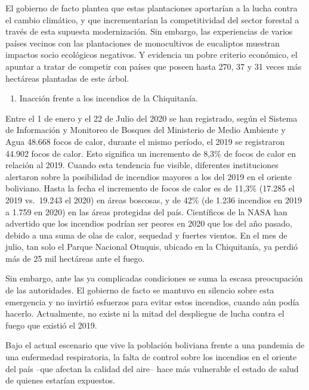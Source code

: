 \documentclass[a4paper, nobind]{templates/ociamthesis}
\providecommand{\tightlist}{%
  \setlength{\itemsep}{0pt}\setlength{\parskip}{0pt}}
\begin{document}
El gobierno de facto plantea que estas plantaciones aportarían a la lucha contra el cambio climático, y que incrementarían la competitividad del sector forestal a través de esta supuesta modernización. Sin embargo, las experiencias de varios países vecinos con las plantaciones de monocultivos de eucaliptos muestran impactos socio ecológicos negativos. Y evidencia un pobre criterio económico, el apuntar a tratar de competir con países que poseen hasta 270, 37 y 31 veces más hectáreas plantadas de este árbol.

\begin{enumerate}
\def\labelenumi{\arabic{enumi}.}
\setcounter{enumi}{2}
\tightlist
\item
  Inacción frente a los incendios de la Chiquitanía.
\end{enumerate}

Entre el 1 de enero y el 22 de Julio del 2020 se han registrado, según el Sistema de Información y Monitoreo de Bosques del Ministerio de Medio Ambiente y Agua 48.668 focos de calor, durante el mismo período, el 2019 se registraron 44.902 focos de calor. Esto significa un incremento de 8,3\% de focos de calor en relación al 2019.
Cuando esta tendencia fue visible, diferentes instituciones alertaron sobre la posibilidad de incendios mayores a los del 2019 en el oriente boliviano. Hasta la fecha el incremento de focos de calor es de 11,3\% (17.285 el 2019 vs.~19.243 el 2020) en áreas boscosas, y de 42\% (de 1.236 incendios en 2019 a 1.759 en 2020) en las áreas protegidas del país. Científicos de la NASA han advertido que los incendios podrían ser peores en 2020 que los del año pasado, debido a una suma de olas de calor, sequedad y fuertes vientos. En el mes de julio, tan solo el Parque Nacional Otuquis, ubicado en la Chiquitanía, ya perdió más de 25 mil hectáreas ante el fuego.

Sin embargo, ante las ya complicadas condiciones se suma la escasa preocupación de las autoridades. El gobierno de facto se mantuvo en silencio sobre esta emergencia y no invirtió esfuerzos para evitar estos incendios, cuando aún podía hacerlo. Actualmente, no existe ni la mitad del despliegue de lucha contra el fuego que existió el 2019.

Bajo el actual escenario que vive la población boliviana frente a una pandemia de una enfermedad respiratoria, la falta de control sobre los incendios en el oriente del país --que afectan la calidad del aire-- hace más vulnerable el estado de salud de quienes estarían expuestos.
\end{document}
